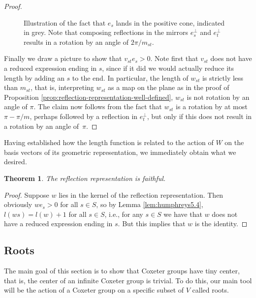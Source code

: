 \documentclass{article}
\newtheorem{theorem}{Theorem}[section]
\theoremstyle{definition}
\begin{document}
\begin{proof}
\begin{figure}[ht]
\begin{minipage}{.5\textwidth}
\end{minipage}
\caption{Illustration of the fact that $e_s$ lands in the positive cone, indicated in grey. Note that composing reflections in the mirrors $e_s^\perp$ and $e_t^\perp$ results in a rotation by an angle of $2\pi/m_{st}$.}
\end{figure}

Finally we draw a picture to show that $v_{st}e_s > 0$. Note first that $v_{st}$ does not have a reduced expression ending in $s$, since if it did we would actually reduce its length by adding an $s$ to the end. In particular, the length of $w_{st}$ is strictly less than $m_{st}$, that is, interpreting $w_{st}$ as a map on the plane as in the proof of Proposition \ref{prop:reflection-representation-well-defined}, $w_{st}$ is not rotation by an angle of $\pi$. The claim now follows from the fact that $w_{st}$ is a rotation by at most $\pi - \pi/m$, perhaps followed by a reflection in $e_t^\perp$, but only if this does not result in a rotation by an angle of~$\pi$.
\end{proof}

Having established how the length function is related to the action of $W$ on the basis vectors of its geometric representation, we immediately obtain what we desired.

\begin{theorem}
The reflection representation is faithful.
\end{theorem}

\begin{proof}
Suppose $w$ lies in the kernel of the reflection representation. Then obviously $we_s > 0$ for all $s \in S$, so by Lemma \ref{lem:humphreys5.4}, $l(ws) = l(w) + 1$ for all $s \in S$, i.e., for any $s \in S$ we have that $w$ does not have a reduced expression ending in $s$. But this implies that $w$ is the identity.
\end{proof}

\subsection{Roots}\label{subsec:roots}
The main goal of this section is to show that Coxeter groups have tiny center, that is, the center of an infinite Coxeter group is trivial. To do this, our main tool will be the action of a Coxeter group on a specific subset of $V$ called roots.
\end{document}
